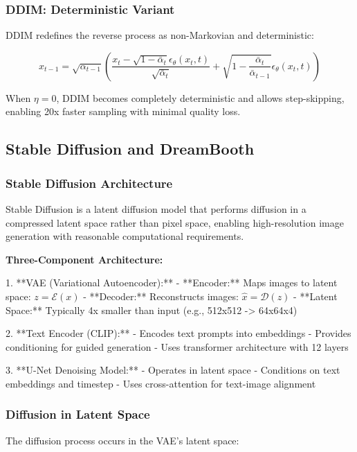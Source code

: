 \documentclass[a4paper,12pt]{article}
\begin{document}
\subsubsection{DDIM: Deterministic Variant}

DDIM redefines the reverse process as non-Markovian and deterministic:

\[ x_{t-1} = \sqrt{\alpha_{t-1}} \left( \frac{x_t - \sqrt{1-\bar{\alpha}_t} \epsilon_\theta(x_t, t)}{\sqrt{\bar{\alpha}_t}} + \sqrt{1 - \frac{\bar{\alpha}_t}{\bar{\alpha}_{t-1}}} \epsilon_\theta(x_t, t) \right) \]

When $\eta = 0$, DDIM becomes completely deterministic and allows step-skipping, enabling 20x faster sampling with minimal quality loss.

\subsection{Stable Diffusion and DreamBooth}

\subsubsection{Stable Diffusion Architecture}

Stable Diffusion is a latent diffusion model that performs diffusion in a compressed latent space rather than pixel space, enabling high-resolution image generation with reasonable computational requirements.

\textbf{Three-Component Architecture:}

1. **VAE (Variational Autoencoder):**
   - **Encoder:** Maps images to latent space: $z = \mathcal{E}(x)$
   - **Decoder:** Reconstructs images: $\hat{x} = \mathcal{D}(z)$
   - **Latent Space:** Typically 4x smaller than input (e.g., 512x512 -> 64x64x4)

2. **Text Encoder (CLIP):**
   - Encodes text prompts into embeddings
   - Provides conditioning for guided generation
   - Uses transformer architecture with 12 layers

3. **U-Net Denoising Model:**
   - Operates in latent space
   - Conditions on text embeddings and timestep
   - Uses cross-attention for text-image alignment

\subsubsection{Diffusion in Latent Space}

The diffusion process occurs in the VAE's latent space:
\end{document}
